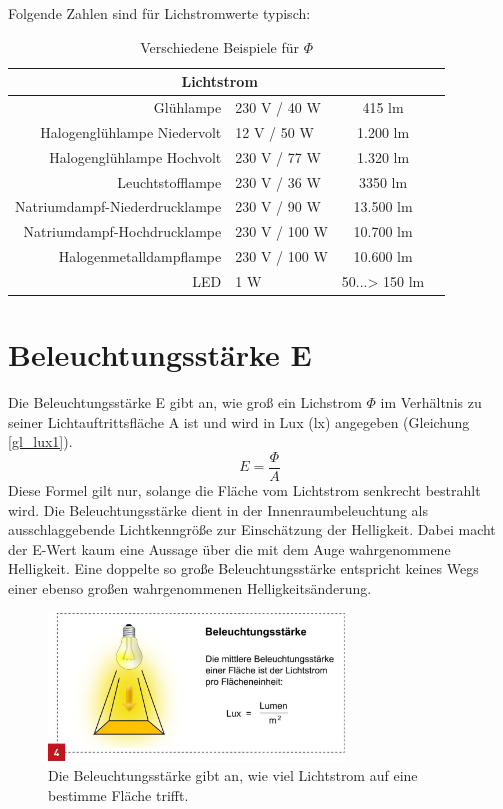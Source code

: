 Folgende Zahlen sind für Lichstromwerte typisch:
\newpage
\begin{table}[htp] 
		\centering
		\begin{tabular}{rlcc}  %
		\toprule
		\multicolumn{3}{c}{\large\sffamily Lichtstrom}\\ 							
		\midrule
		Glühlampe & 230 V / 40 W & 415 lm\\ 
		Halogenglühlampe Niedervolt & 12 V / 50 W & 1.200 lm\\
		Halogenglühlampe Hochvolt & 230 V / 77 W & 1.320 lm\\
		Leuchtstofflampe & 230 V / 36 W & 3350 lm\\
		Natriumdampf-Niederdrucklampe & 230 V / 90 W & 13.500 lm\\
		Natriumdampf-Hochdrucklampe & 230 V / 100 W & 10.700 lm\\
		Halogenmetalldampflampe & 230 V / 100 W & 10.600 lm\\
		LED & 1 W & 50...> 150 lm\\
		\bottomrule
		\end{tabular}
		\caption{Verschiedene Beispiele für $\Phi$\protect\footnotemark}	
		\label{t_lumen}
	\end{table}


\section{Beleuchtungsstärke E}\label{sec_lux}
Die Beleuchtungsstärke E gibt an, wie groß ein Lichstrom $\Phi$ im Verhältnis zu seiner Lichtauftrittsfläche A ist  und wird in Lux (lx) angegeben (Gleichung \ref{gl_lux1}).
 \begin{equation}\label{gl_lux1}
	E=\frac{\Phi}{A}	
\end{equation}
Diese Formel gilt nur, solange die Fläche vom Lichtstrom senkrecht bestrahlt wird. Die Beleuchtungsstärke dient in der Innenraumbeleuchtung als ausschlaggebende Lichtkenngröße zur Einschätzung der Helligkeit. Dabei macht der E-Wert kaum eine Aussage über die mit dem Auge wahrgenommene Helligkeit. Eine doppelte so große Beleuchtungsstärke entspricht keines Wegs einer ebenso großen wahrgenommenen Helligkeitsänderung.

\begin{figure}[H]     %
\centering
\includegraphics[width=0.7\textwidth]{bilder/lux} 
\caption {Die Beleuchtungsstärke gibt an, wie viel Lichtstrom auf eine bestimme Fläche trifft.\protect\footnotemark}\label{b_lux}
\end{figure}

